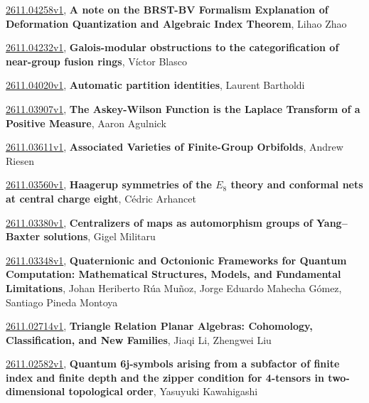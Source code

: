 \documentclass[9pt, a4paper]{article}
\theoremstyle{plain}
\theoremstyle{definition}
\theoremstyle{remark}
\newcommand{\arxiv}[3]{\href{https://arxiv.org/abs/#1}{#1}, \textbf{\textcolor{arxivblue}{#2}}, #3}
\begin{document}
\arxiv{2611.04258v1}{A note on the BRST-BV Formalism Explanation of Deformation Quantization and Algebraic Index Theorem}{Lihao Zhao}

\arxiv{2611.04232v1}{Galois-modular obstructions to the categorification of near-group fusion rings}{Víctor Blasco}

\arxiv{2611.04020v1}{Automatic partition identities}{Laurent Bartholdi}

\arxiv{2611.03907v1}{The Askey-Wilson Function is the Laplace Transform of a Positive Measure}{Aaron Agulnick}

\arxiv{2611.03611v1}{Associated Varieties of Finite-Group Orbifolds}{Andrew Riesen}

\arxiv{2611.03560v1}{Haagerup symmetries of the $E_8$ theory and conformal nets at central charge eight}{Cédric Arhancet}

\arxiv{2611.03380v1}{Centralizers of maps as automorphism groups of Yang--Baxter solutions}{Gigel Militaru}

\arxiv{2611.03348v1}{Quaternionic and Octonionic Frameworks for Quantum Computation: Mathematical Structures, Models, and Fundamental Limitations}{Johan Heriberto Rúa Muñoz, Jorge Eduardo Mahecha Gómez, Santiago Pineda Montoya}

\arxiv{2611.02714v1}{Triangle Relation Planar Algebras: Cohomology, Classification, and New Families}{Jiaqi Li, Zhengwei Liu}

\arxiv{2611.02582v1}{Quantum 6j-symbols arising from a subfactor of finite index and finite depth and the zipper condition for 4-tensors in two-dimensional topological order}{Yasuyuki Kawahigashi}

\end{document}
